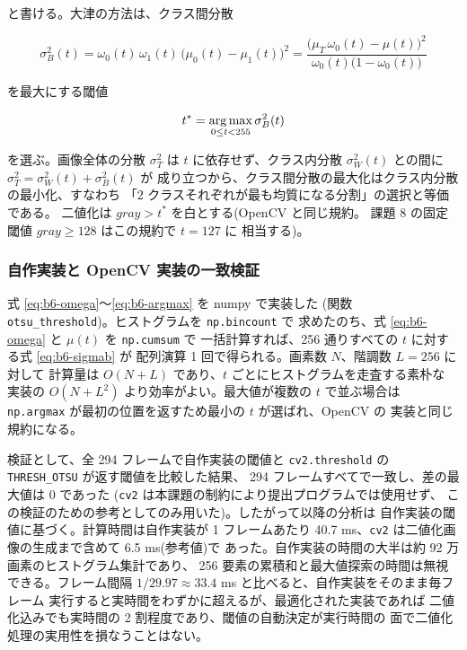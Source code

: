 と書ける。大津の方法は、クラス間分散

\begin{equation}\label{eq:b6-sigmab}
\sigma_B^2(t)
= \omega_0(t)\,\omega_1(t)\,\bigl(\mu_0(t) - \mu_1(t)\bigr)^2
= \frac{\bigl(\mu_T\,\omega_0(t) - \mu(t)\bigr)^2}
       {\omega_0(t)\bigl(1 - \omega_0(t)\bigr)}
\end{equation}

を最大にする閾値

\begin{equation}\label{eq:b6-argmax}
t^{*} = \mathop{\rm arg\,max}_{0 \le t < 255} \sigma_B^2(t)
\end{equation}

を選ぶ。画像全体の分散 $\sigma_T^2$ は $t$ に依存せず、クラス内分散
$\sigma_W^2(t)$ との間に $\sigma_T^2 = \sigma_W^2(t) + \sigma_B^2(t)$ が
成り立つから、クラス間分散の最大化はクラス内分散の最小化、すなわち
「2 クラスそれぞれが最も均質になる分割」の選択と等価である。
二値化は $\mathit{gray} > t^{*}$ を白とする(OpenCV と同じ規約。
課題 8 の固定閾値 $\mathit{gray} \ge 128$ はこの規約で $t = 127$ に
相当する)。

\subsubsection{自作実装と OpenCV 実装の一致検証}

式 \ref{eq:b6-omega}〜\ref{eq:b6-argmax} を numpy で実装した
(関数 {\tt otsu\_threshold})。ヒストグラムを {\tt np.bincount} で
求めたのち、式 \ref{eq:b6-omega} と $\mu(t)$ を {\tt np.cumsum} で
一括計算すれば、256 通りすべての $t$ に対する式 \ref{eq:b6-sigmab} が
配列演算 1 回で得られる。画素数 $N$、階調数 $L = 256$ に対して
計算量は $O(N + L)$ であり、$t$ ごとにヒストグラムを走査する素朴な
実装の $O(N + L^2)$ より効率がよい。最大値が複数の $t$ で並ぶ場合は
{\tt np.argmax} が最初の位置を返すため最小の $t$ が選ばれ、OpenCV の
実装と同じ規約になる。

検証として、全 294 フレームで自作実装の閾値と
{\tt cv2.threshold} の {\tt THRESH\_OTSU} が返す閾値を比較した結果、
294 フレームすべてで一致し、差の最大値は 0 であった
({\tt cv2} は本課題の制約により提出プログラムでは使用せず、
この検証のための参考としてのみ用いた)。したがって以降の分析は
自作実装の閾値に基づく。計算時間は自作実装が 1 フレームあたり
40.7 ms、{\tt cv2} は二値化画像の生成まで含めて 6.5 ms(参考値)で
あった。自作実装の時間の大半は約 92 万画素のヒストグラム集計であり、
256 要素の累積和と最大値探索の時間は無視できる。フレーム間隔
$1/29.97 \approx 33.4$ ms と比べると、自作実装をそのまま毎フレーム
実行すると実時間をわずかに超えるが、最適化された実装であれば
二値化込みでも実時間の 2 割程度であり、閾値の自動決定が実行時間の
面で二値化処理の実用性を損なうことはない。

